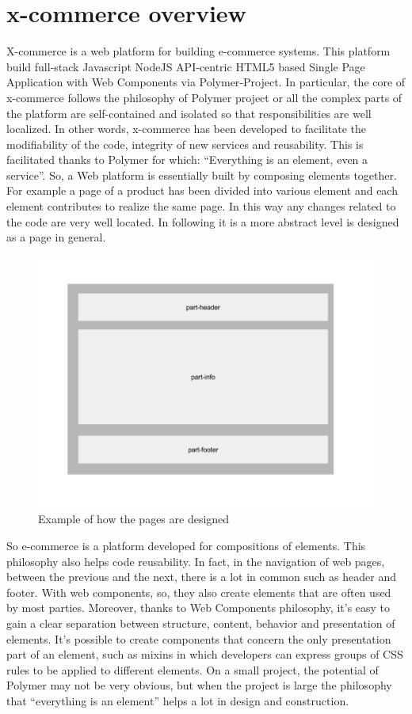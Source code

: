 \section{x-commerce overview}
\label{sec:x_commerce_overview}
X-commerce is a web platform for building e-commerce systems. This platform build full-stack Javascript NodeJS API-centric HTML5 based Single Page Application with Web Components via Polymer-Project. In particular, the core of x-commerce follows the philosophy of Polymer project or all the complex parts of the platform are self-contained and isolated so that responsibilities are well localized. In other words, x-commerce has been developed to facilitate the modifiability of the code, integrity of new services and reusability. This is facilitated thanks to Polymer for which: “Everything is an element, even a service”.
So, a Web platform is essentially built by composing elements together.
\newline
For example a page of a product has been divided into various element and each element contributes to realize the same page. In this way any changes related to the code are very well located. In following it is a more abstract level is designed as a page in general.
\begin{figure}[htb]
 \centering
 \includegraphics[width=1.0\linewidth]{images/chapter4/design-page.jpg}\hfill
 \caption[Design page]{Example of how the pages are designed}
 \label{fig:design_page}
\end{figure}
So e-commerce is a platform developed for compositions of elements. This philosophy also helps code reusability. In fact, in the navigation of web pages, between the previous and the next, there is a lot in common such as header and footer. With web components, so, they also create elements that are often used by most parties.
Moreover, thanks to Web Components philosophy, it’s easy to gain a clear separation between structure, content, behavior and presentation of elements. It’s possible to create components that concern the only presentation part of an element, such as mixins in which developers can express groups of CSS rules to be applied to different elements.
\newline
On a small project, the potential of Polymer may not be very obvious, but when the project is large the philosophy that “everything is an element” helps a lot in design and construction.